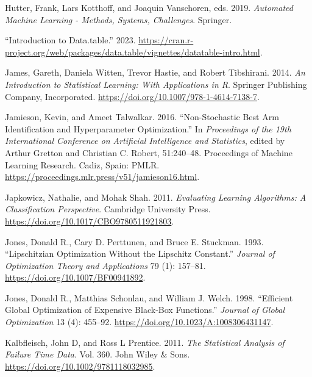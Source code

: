 \begin{CSLReferences}{1}{0}
\leavevmode{}%
Hutter, Frank, Lars Kotthoff, and Joaquin Vanschoren, eds. 2019.
\emph{Automated Machine Learning - Methods, Systems, Challenges}.
Springer.

\leavevmode{}%
{``Introduction to Data.table.''} 2023.
\url{https://cran.r-project.org/web/packages/data.table/vignettes/datatable-intro.html}.

\leavevmode{}%
James, Gareth, Daniela Witten, Trevor Hastie, and Robert Tibshirani.
2014. \emph{An Introduction to Statistical Learning: With Applications
in {R}}. Springer Publishing Company, Incorporated.
\url{https://doi.org/10.1007/978-1-4614-7138-7}.

\leavevmode{}%
Jamieson, Kevin, and Ameet Talwalkar. 2016. {``Non-Stochastic Best Arm
Identification and Hyperparameter Optimization.''} In \emph{Proceedings
of the 19th International Conference on Artificial Intelligence and
Statistics}, edited by Arthur Gretton and Christian C. Robert,
51:240--48. Proceedings of Machine Learning Research. Cadiz, Spain:
PMLR. \url{https://proceedings.mlr.press/v51/jamieson16.html}.

\leavevmode{}%
Japkowicz, Nathalie, and Mohak Shah. 2011. \emph{Evaluating Learning
Algorithms: A Classification Perspective}. Cambridge University Press.
\url{https://doi.org/10.1017/CBO9780511921803}.

\leavevmode{}%
Jones, Donald R., Cary D. Perttunen, and Bruce E. Stuckman. 1993.
{``Lipschitzian Optimization Without the {L}ipschitz Constant.''}
\emph{Journal of Optimization Theory and Applications} 79 (1): 157--81.
\url{https://doi.org/10.1007/BF00941892}.

\leavevmode{}%
Jones, Donald R., Matthias Schonlau, and William J. Welch. 1998.
{``Efficient Global Optimization of Expensive Black-Box Functions.''}
\emph{Journal of Global Optimization} 13 (4): 455--92.
\url{https://doi.org/10.1023/A:1008306431147}.

\leavevmode{}%
Kalbfleisch, John D, and Ross L Prentice. 2011. \emph{The Statistical
Analysis of Failure Time Data}. Vol. 360. John Wiley \& Sons.
\url{https://doi.org/10.1002/9781118032985}.


\end{CSLReferences}

